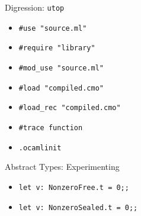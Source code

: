 \documentclass{beamer}
\newcommand{\code}[1]{\texttt{#1}}
\begin{document}
    \begin{frame}{Digression: \code{utop}}
        \begin{itemize}
            \item<1-> \texttt{\#use "source.ml"}
            \item<2-> \texttt{\#require "library"}
            \item<3-> \texttt{\#mod\_use "source.ml"}
            \item<4-> \texttt{\#load "compiled.cmo"}
            \item<5-> \texttt{\#load\_rec "compiled.cmo"}
            \item<6-> \texttt{\#trace function}
            \item<7-> \texttt{.ocamlinit}
        \end{itemize}
    \end{frame}

    \begin{frame}{Abstract Types: Experimenting}
        \begin{itemize}
            \item \code{let v: NonzeroFree.t = 0;;}
            \item \code{let v: NonzeroSealed.t = 0;;}
        \end{itemize}
    \end{frame}
\end{document}
